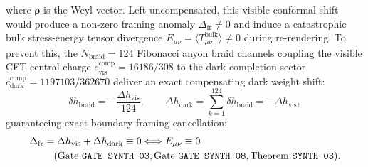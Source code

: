 \documentclass[11pt,onecolumn]{article}
\begin{document}
where $\bm{\rho}$ is the Weyl vector. Left uncompensated, this visible conformal shift would produce a non-zero framing anomaly $\Delta_{\text{fr}} \neq 0$ and induce a catastrophic bulk stress-energy tensor divergence $E_{\mu\nu} = \langle T_{\mu\nu}^{\text{bulk}} \rangle \neq 0$ during re-rendering. To prevent this, the $N_{\text{braid}} = 124$ Fibonacci anyon braid channels coupling the visible CFT central charge $c_{\text{vis}}^{\text{comp}} = 16186/308$ to the dark completion sector $c_{\text{dark}}^{\text{comp}} = 1197103/362670$ deliver an exact compensating dark weight shift:
\begin{equation}
\delta h_{\text{braid}} = -\frac{\Delta h_{\text{vis}}}{124}, \qquad \Delta h_{\text{dark}} = \sum_{k=1}^{124} \delta h_{\text{braid}} = -\Delta h_{\text{vis}},
\label{eq:dark_braid_compensation}
\end{equation}
guaranteeing exact boundary framing cancellation:
\begin{equation}
\begin{split}
\Delta_{\text{fr}} &= \Delta h_{\text{vis}} + \Delta h_{\text{dark}} \equiv 0 \Longleftrightarrow E_{\mu\nu} \equiv 0 \\
&\quad (\text{Gate \texttt{GATE-SYNTH-03}}, \text{Gate \texttt{GATE-SYNTH-08}}, \text{Theorem \texttt{SYNTH-03}}).
\end{split}
\label{eq:framing_closure_general}
\end{equation}

\FloatBarrier
\end{document}
